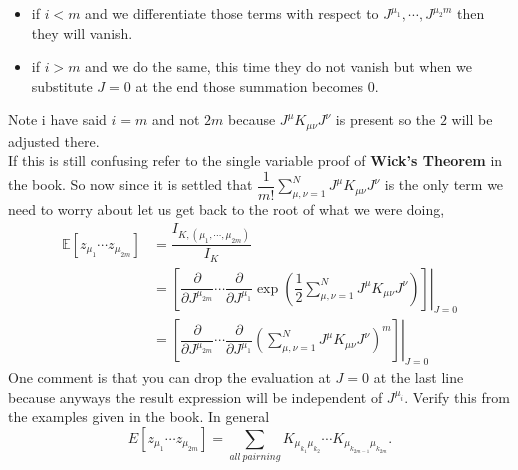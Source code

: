 \documentclass{scrartcl} %
\numberwithin{equation}{subsection}  %
\begin{document}
\begin{itemize}
	\item if $i < m$ and we differentiate those terms with respect to $J^{\mu_1},\cdots, J^{\mu_2m}$
		then they will vanish.
	\item if $i >m$ and we do the same, this time they do not vanish but when we substitute $J = 0$ at the end 
		those summation becomes $0$.
\end{itemize}
Note i have said $i = m$ and not $2m$ because $J^{\mu}K_{\mu \nu} J^{\nu}$ is present so the $2$ will be adjusted there.\\
If this is still confusing refer to the single variable proof of \textbf{Wick's Theorem} in the book. So now since
it is settled that $\dfrac{1}{m!}\sum\limits_{\mu, \nu = 1}^N J^{\mu} K_{\mu \nu} J^{\nu}$ is the only term we need
to worry about let us get back to the root of what we were doing,
\begin{align}
\mathbb{E}[z_{\mu_1}\cdots z_{\mu_{2m}}] &= \dfrac{I_{K,(\mu_1,\cdots,\mu_{2m})}}{I_K}\\
						 &= 
\left. \left[\dfrac{\partial}{\partial J^{\mu_{2m}}}\cdots\dfrac{\partial}{\partial J^{\mu_1}}\exp\left(\dfrac{1}{2}
		\sum\limits_{\mu,\nu = 1}^N J^{\mu}K_{\mu \nu} J^{\nu}\right)\right]\right|_{J=0}\\
		&=\left .\left[\dfrac{\partial}{\partial J^{\mu_{2m}}}\cdots\dfrac{\partial}{\partial J^{\mu_1}}
			\left(\sum\limits_{\mu,\nu = 1}^N J^{\mu}K_{\mu \nu}J^{\nu}\right)^m\right]\right|_{J=0}
\end{align}
One comment is that you can drop the evaluation at $J = 0$ at the last line because anyways the result expression will
be independent of $J^{\mu_i}$. Verify this from the examples given in the book. In general 
\[
	E[z_{\mu_1}\cdots z_{\mu_{2m}}] = \sum\limits_{all \ pairning} K_{\mu_{k_1}\mu_{k_2}}\cdots
	K_{\mu_{k_{2m-1}}\mu_{k_{2m}}}.
\]
\end{document}
